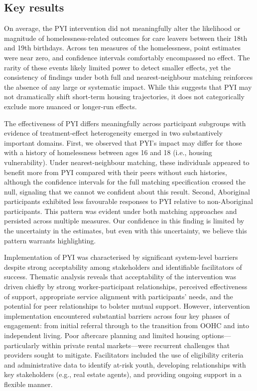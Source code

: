 \documentclass[
  jou,
  floatsintext,
  longtable,
  nolmodern,
  notxfonts,
  notimes,
  colorlinks=true,linkcolor=blue,citecolor=blue,urlcolor=blue]{apa7}
\begin{document}
\subsection{Key results}\label{key-results}

On average, the PYI intervention did not meaningfully alter the
likelihood or magnitude of homelessness-related outcomes for care
leavers between their 18th and 19th birthdays. Across ten measures of
the homelessness, point estimates were near zero, and confidence
intervals comfortably encompassed no effect. The rarity of these events
likely limited power to detect smaller effects, yet the consistency of
findings under both full and nearest‐neighbour matching reinforces the
absence of any large or systematic impact. While this suggests that PYI
may not dramatically shift short-term housing trajectories, it does not
categorically exclude more nuanced or longer-run effects.

The effectiveness of PYI differs meaningfully across participant
subgroups with evidence of treatment-effect heterogeneity emerged in two
substantively important domains. First, we observed that PYI's impact
may differ for those with a history of homelessness between ages 16 and
18 (i.e., housing vulnerability). Under nearest-neighbour matching,
these individuals appeared to benefit more from PYI compared with their
peers without such histories, although the confidence intervals for the
full matching specification crossed the null, signaling that we cannot
we confident about this result. Second, Aboriginal participants
exhibited less favourable responses to PYI relative to non-Aboriginal
participants. This pattern was evident under both matching approaches
and persisted across multiple measures. Our confidence in this finding
is limited by the uncertainty in the estimates, but even with this
uncertainty, we believe this pattern warrants highlighting.

Implementation of PYI was characterised by significant system-level
barriers despite strong acceptability among stakeholders and
identifiable facilitators of success. Thematic analysis reveals that
acceptability of the intervention was driven chiefly by strong
worker-participant relationships, perceived effectiveness of support,
appropriate service alignment with participants' needs, and the
potential for peer relationships to bolster mutual support. However,
intervention implementation encountered substantial barriers across four
key phases of engagement: from initial referral through to the
transition from OOHC and into independent living. Poor aftercare
planning and limited housing options---particularly within private
rental markets---were recurrent challenges that providers sought to
mitigate. Facilitators included the use of eligibility criteria and
administrative data to identify at-risk youth, developing relationships
with key stakeholders (e.g., real estate agents), and providing ongoing
support in a flexible manner.
\end{document}
